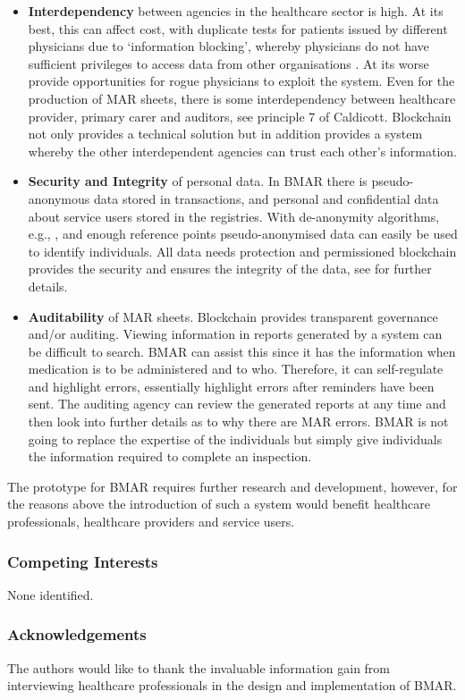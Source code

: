 \documentclass[runningheads]{llncs}
\begin{document}
\begin{itemize}
	\item {\bf Interdependency} between agencies in the healthcare sector is high. At its best, this can affect cost, with duplicate tests for patients issued by different physicians due to `information blocking', whereby physicians do not have sufficient privileges to access data from other organisations \cite{azaria2016medrec}. At its worse provide opportunities for rogue physicians to exploit the system. Even for the production of MAR sheets, there is some interdependency between healthcare provider, primary carer and auditors, see principle 7 of Caldicott. Blockchain not only provides a technical solution but in addition provides a system whereby the other interdependent agencies can trust each other's information.
	\item{\bf Security and Integrity} of personal data. In BMAR there is pseudo-anonymous data stored in transactions, and personal and confidential data about service users stored in the registries. With de-anonymity algorithms, e.g., \cite{de2013unique}, and enough reference points pseudo-anonymised data can easily be used to identify individuals. All data needs protection and permissioned blockchain provides the security and ensures the integrity of the data, see \cite[ch. 5]{gupta:2018} for further details.
	\item{\bf Auditability} of MAR sheets. Blockchain provides transparent governance and/or auditing. Viewing information in reports generated by a system can be difficult to search. BMAR can assist this since it has the information when medication is to be administered and to who. Therefore, it can self-regulate and highlight errors, essentially highlight errors after reminders have been sent. The auditing agency can review the generated reports at any time and then look into further details as to why there are MAR errors. BMAR is not going to replace the expertise of the individuals but simply give individuals the information required to complete an inspection. 
\end{itemize}

The prototype for BMAR requires further research and development, however, for the reasons above the introduction of such a system would benefit healthcare professionals, healthcare providers and service users. 

\subsubsection*{Competing Interests}
None identified.

\subsubsection*{Acknowledgements} The authors would like to thank the invaluable information gain from interviewing healthcare professionals in the design and implementation of BMAR.



\end{document}
